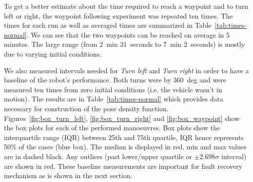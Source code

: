 To get a better estimate about the time required to reach a waypoint and to turn left or right, the waypoint following experiment was repeated ten times. The times for each run as well as averaged times are summarized in Table~\ref{tab:times-normal}. We can see that the two waypoints can be reached on average in 5 minutes. The large range (from 2~min 31~seconds to 7~min 2~seconds) is mostly due to varying initial conditions.

We also measured intervals needed for \textit{Turn left} and \textit{Turn right} in order to have a baseline of the robot's performance. Both turns were by 360~deg and were measured ten times from zero initial conditions (i.e. the vehicle wasn't in motion). The results are in Table~\ref{tab:times-normal} which provides data necessary for construction of the pose density function. Figures~\ref{fig:box_turn_left}, \ref{fig:box_turn_right} and \ref{fig:box_waypoint} show the box plots for each of the performed manoeuvres. Box plots show the interquartile range (IQR) between 25th and 75th quartile, IQR hence represents 50\% of the cases (blue box). The median is displayed in red, min and max values are in dashed black. Any outliers (past lower/upper quartile or $\pm2.698\sigma$ interval) are shown in red. These baseline measurements are important for fault recovery mechanism as is shown in the next section.


